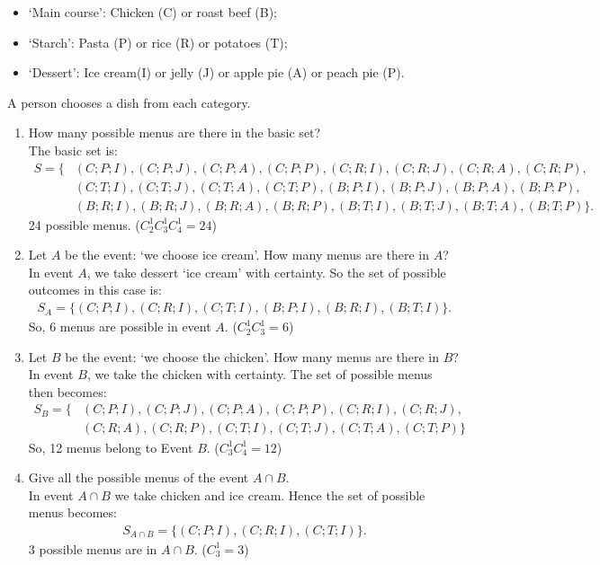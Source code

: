 \documentclass[12pt,thmsa]{article}
\begin{document}
\begin{itemize}
\item `Main course': Chicken (C) or roast beef (B);
\item `Starch': Pasta (P) or rice (R) or potatoes (T);
\item `Dessert': Ice cream(I) or jelly (J) or apple pie (A) or peach pie (P).
\end{itemize}

A person chooses a dish from each category.

\begin{enumerate}
\item How many possible menus are there in the basic set?\\
The basic set is:
\begin{align*}
S= \{ & (C;P;I), (C;P;J), (C;P;A), (C;P;P), (C;R;I), (C;R;J), (C;R;A), (C;R;P),\\ & (C;T;I), (C;T;J), (C;T;A), (C;T;P),  (B;P;I), (B;P;J), (B;P;A), (B;P;P),\\ & (B;R;I), (B;R;J), (B;R;A), (B;R;P),(B;T;I), (B;T;J), (B;T;A), (B;T;P) \}.
\end{align*}
24 possible menus. ($C^{1}_{2}C^{1}_{3}C^{1}_{4}=24$)
\medskip

\item Let $A$ be the event: `we choose ice cream'. How many menus are there in $A$?\\
In event $A$, we take dessert `ice cream' with certainty. So the set of possible outcomes in this case is:
\begin{align*}
S_A = \{ (C;P;I),(C;R;I), (C;T;I), (B;P;I),(B;R;I), (B;T;I)   \}.
\end{align*}
So, 6 menus are possible in event $A$. ($C^{1}_{2}C^{1}_{3}=6$)
\medskip

\item  Let $B$ be the event: `we choose the chicken'. How many menus are there in $B$?\\
In event $B$, we take the chicken with certainty. The set of possible menus then becomes:
\begin{align*}
S_B = \{  & (C;P;I), (C;P;J), (C;P;A), (C;P;P), (C;R;I), (C;R;J), \\ & (C;R;A), (C;R;P), (C;T;I), (C;T;J), (C;T;A), (C;T;P) \}
\end{align*}
So, 12 menus belong to Event $B$. ($C^{1}_{3}C^{1}_{4}=12$)
\medskip

\item Give all the possible menus of the event $A \cap B$.\\
In event $A\cap B$ we take chicken and ice cream. Hence the set of possible menus becomes:  
\begin{align*}
S_{A \cap B} = \{ (C;P;I),(C;R;I),(C;T;I)  \}.
\end{align*}
3 possible menus are in $A\cap B$. ($C^{1}_{3}=3$)
\medskip


\end{enumerate}
\end{document}
